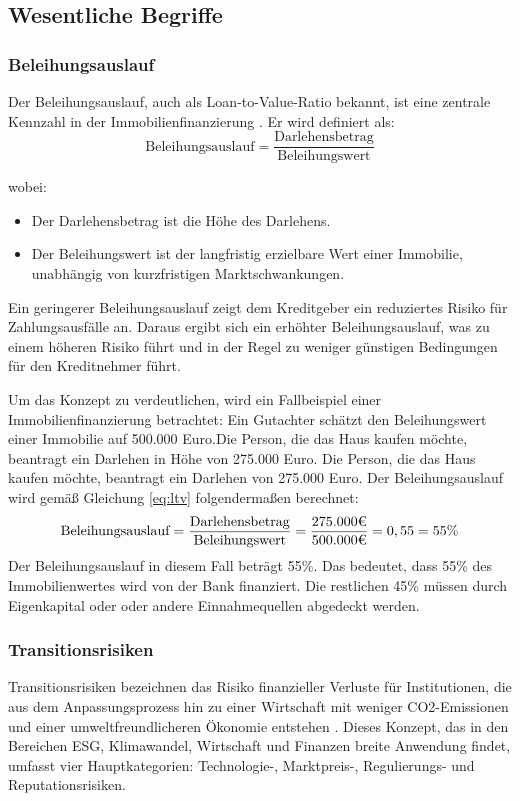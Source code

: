 
\subsection{Wesentliche Begriffe}
\subsubsection{Beleihungsauslauf}
Der Beleihungsauslauf, auch als Loan-to-Value-Ratio bekannt, ist eine zentrale Kennzahl in der Immobilienfinanzierung \parencite{BelWertV_3}. Er wird definiert als:
\begin{equation}
    \text{Beleihungsauslauf} = \frac{\text{Darlehensbetrag}}{\text{Beleihungswert}}
    \label{eq:ltv}
\end{equation}

\noindent wobei:
\begin{itemize}
    \item Der Darlehensbetrag ist die Höhe des Darlehens.
    \item Der Beleihungswert ist der langfristig erzielbare Wert einer Immobilie, unabhängig von kurzfristigen Marktschwankungen.
\end{itemize}

Ein geringerer Beleihungsauslauf zeigt dem Kreditgeber ein reduziertes Risiko für Zahlungsausfälle an. Daraus ergibt sich ein erhöhter Beleihungsauslauf, was zu einem höheren Risiko führt und in der Regel zu weniger günstigen Bedingungen für den Kreditnehmer führt.

Um das Konzept zu verdeutlichen, wird ein Fallbeispiel einer Immobilienfinanzierung betrachtet: Ein Gutachter schätzt den Beleihungswert einer Immobilie auf 500.000 Euro.Die Person, die das Haus kaufen möchte, beantragt ein Darlehen in Höhe von 275.000 Euro. Die Person, die das Haus kaufen möchte, beantragt ein Darlehen von 275.000 Euro.
Der Beleihungsauslauf wird gemäß Gleichung \ref{eq:ltv} folgendermaßen berechnet:
\begin{equation}
    \text{Beleihungsauslauf} = \frac{\text{Darlehensbetrag}}{\text{Beleihungswert}} = \frac{275.000 \mbox{\texteuro}}{500.000 \mbox{\texteuro}} = 0,55 = 55\%
\end{equation}
Der Beleihungsauslauf in diesem Fall beträgt 55\%. Das bedeutet, dass 55\% des Immobilienwertes wird von der Bank finanziert. Die restlichen 45\% müssen durch Eigenkapital oder oder andere Einnahmequellen abgedeckt werden.
\subsubsection{Transitionsrisiken}
Transitionsrisiken bezeichnen das Risiko finanzieller Verluste für Institutionen, die aus dem Anpassungsprozess hin zu einer Wirtschaft mit weniger CO2-Emissionen und einer umweltfreundlicheren Ökonomie entstehen \parencite{ecb2020climate}. Dieses Konzept, das in den Bereichen ESG, Klimawandel, Wirtschaft und Finanzen breite Anwendung findet, umfasst vier Hauptkategorien: Technologie-, Marktpreis-, Regulierungs- und Reputationsrisiken.

